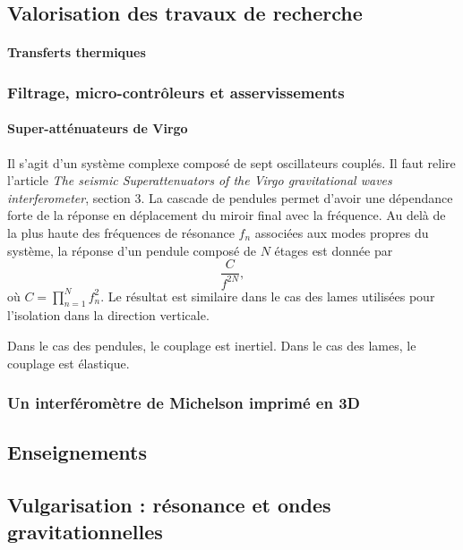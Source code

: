 \documentclass[12pt,a4paper]{article}
\begin{document}
\subsection{Valorisation des travaux de recherche}

\paragraph{Transferts thermiques\\}

\subsubsection{Filtrage, micro-contrôleurs et asservissements}
\label{sec:controls}

\paragraph{Super-atténuateurs de Virgo\\}

Il s'agit d'un système complexe composé de sept oscillateurs couplés.
Il faut relire l'article \emph{The seismic Superattenuators of the Virgo gravitational waves interferometer}, section 3.
La cascade de pendules permet d'avoir une dépendance forte de la réponse en déplacement du miroir final avec la fréquence.
Au delà de la plus haute des fréquences de résonance $f_n$ associées aux modes propres du système, la réponse d'un pendule composé de $N$ étages est donnée par
\begin{equation}
\frac{C}{f^{2N}},
\end{equation}
où $C = \prod_{n=1}^N f_n^2$.
Le résultat est similaire dans le cas des lames utilisées pour l'isolation dans la direction verticale.

Dans le cas des pendules, le couplage est inertiel.
Dans le cas des lames, le couplage est élastique.


\subsubsection{Un interféromètre de Michelson imprimé en 3D}

\subsection{Enseignements}

\subsection{Vulgarisation : résonance et ondes gravitationnelles}
\end{document}
